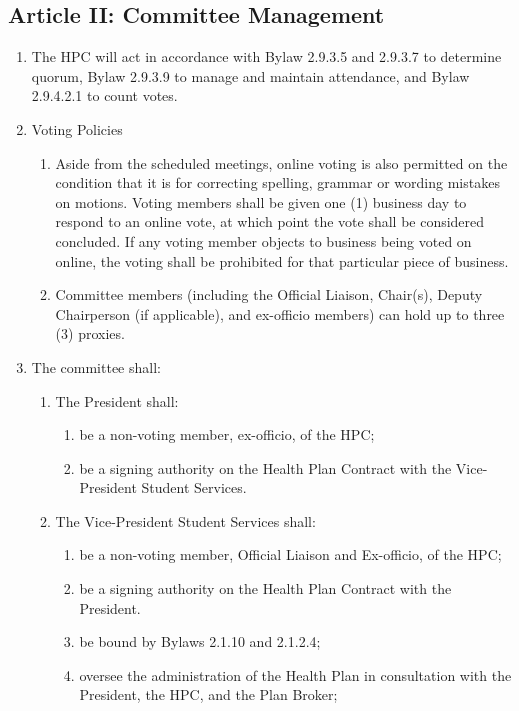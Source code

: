 \subsection{Article II: Committee Management}
\begin{enumerate} [label*=\arabic*., align=left]	
\item The HPC will act in accordance with Bylaw 2.9.3.5 and 2.9.3.7 to determine quorum, Bylaw 2.9.3.9 to manage and maintain attendance, and Bylaw 2.9.4.2.1 to count votes.
\item Voting Policies
\begin{enumerate} [label*=\arabic*., align=left]	
\item Aside from the scheduled meetings, online voting is also permitted on the condition that it is for correcting spelling, grammar or wording mistakes on motions. Voting members shall be given one (1) business day to respond to an online vote, at which point the vote shall be considered concluded. If any voting member objects to business being voted on online, the voting shall be prohibited for that particular piece of business.
\item Committee members (including the Official Liaison, Chair(s), Deputy Chairperson (if applicable), and ex-officio members) can hold up to three (3) proxies.
\end{enumerate}
\item The committee shall:
\begin{enumerate} [label*=\arabic*., align=left]
\item The President shall:
\begin{enumerate} [label*=\arabic*., align=left]
\item be a non-voting member, ex-officio, of the HPC;
\item be a signing authority on the Health Plan Contract with the Vice-President Student Services.
\end{enumerate}
\item The Vice-President Student Services shall: 
\begin{enumerate} [label*=\arabic*., align=left]
\item be a non-voting member, Official Liaison and Ex-officio, of the HPC;
\item be a signing authority on the Health Plan Contract with the President.
\item be bound by Bylaws 2.1.10 and 2.1.2.4;
\item oversee the administration of the Health Plan in consultation with the President, the HPC, and the Plan Broker;

\end{enumerate}
\end{enumerate}
\end{enumerate}
